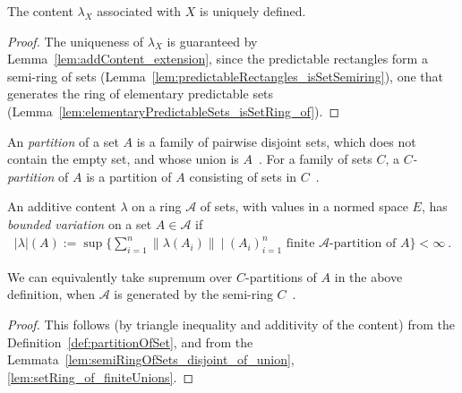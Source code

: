 \begin{lemma}\label{lem:contentAssociatedWithProcess_wellDefined}
  The content $\lambda_X$ associated with $X$ is uniquely defined.
\end{lemma}

\begin{proof}
The uniqueness of $\lambda_X$ is guaranteed by Lemma~\ref{lem:addContent_extension},
since the predictable rectangles form a semi-ring of sets
(Lemma~\ref{lem:predictableRectangles_isSetSemiring}),
one that generates the ring of elementary predictable sets
(Lemma~\ref{lem:elementaryPredictableSets_isSetRing_of}).
\end{proof}

\begin{definition}\label{def:partitionOfSet}
  \mathlibok
  An \emph{partition} of a set $A$ is a family of pairwise disjoint sets,
  which does not contain the empty set, and whose union is $A$~.
  For a family of sets $C$, a \emph{$C$-partition} of $A$ is a partition of $A$ consisting of sets in $C$~.
\end{definition}

\begin{definition}\label{def:contentBoundedVariation}
An additive content $\lambda$ on a ring $\mathcal{A}$ of sets, with values in a normed space $E$,
has \emph{bounded variation} on a set $A \in \mathcal{A}$ if
\begin{align*}
  \vert \lambda \vert(A)
  := \sup
  \Big\{
    \sum_{i=1}^n \| \lambda(A_i) \|
    \:\Big|\:
    (A_i)_{i=1}^n \text{ finite } \mathcal{A}\text{-partition of } A
  \Big\}
  < \infty
  \: .
\end{align*}
\end{definition}

\begin{lemma}\label{lem:contentBoundedVariation_equivOnGenerator}
  We can equivalently take supremum over $C$-partitions of $A$ in the above
  definition, when $\mathcal{A}$ is generated by the semi-ring $C$~.
\end{lemma}

\begin{proof}
  This follows (by triangle inequality and additivity of the content)
  from the Definition~\ref{def:partitionOfSet},
  and from the Lemmata~\ref{lem:semiRingOfSets_disjoint_of_union},
  \ref{lem:setRing_of_finiteUnions}.
\end{proof}


